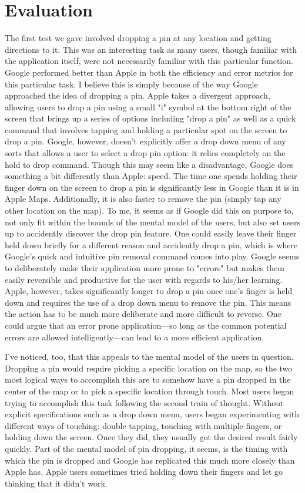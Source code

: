 \documentclass[12pt, oneside]{article}
\begin{document}
\section{Evaluation}
The first test we gave involved dropping a pin at any location and getting directions to it. This was an interesting task as many users, though familiar with the application itself, were not necessarily familiar with this particular function. Google performed better than Apple in both the efficiency and error metrics for this particular task. I believe this is simply because of the way Google approached the idea of dropping a pin. Apple takes a divergent approach, allowing users to drop a pin using a small "i" symbol at the bottom right of the screen that brings up a series of options including "drop a pin" as well as a quick command that involves tapping and holding a particular spot on the screen to drop a pin. Google, however, doesn’t explicitly offer a drop down menu of any sorts that allows a user to select a drop pin option: it relies completely on the hold to drop command. Though this may seem like a disadvantage, Google does something a bit differently than Apple: speed. The time one spends holding their finger down on the screen to drop a pin is significantly less in Google than it is in Apple Maps. Additionally, it is also faster to remove the pin (simply tap any other location on the map). To me, it seems as if Google did this on purpose to, not only fit within the bounds of the mental model of the users, but also set users up to accidently discover the drop pin feature. One could easily leave their finger held down briefly for a different reason and accidently drop a pin, which is where Google's quick and intuitive pin removal command comes into play. Google seems to deliberately make their application more prone to "errors" but makes them easily reversible and productive for the user with regards to his/her learning. Apple, however, takes significantly longer to drop a pin once one's finger is held down and requires the use of a drop down menu to remove the pin. This means the action has to be much more deliberate and more difficult to reverse. One could argue that an error prone application—so long as the common potential errors are allowed intelligently—can lead to a more efficient application.

I've noticed, too, that this appeals to the mental model of the users in question. Dropping a pin would require picking a specific location on the map, so the two most logical ways to accomplish this are to somehow have a pin dropped in the center of the map or to pick a specific location through touch. Most users began trying to accomplish this task following the second train of thought. Without explicit specifications such as a drop down menu, users began experimenting with different ways of touching: double tapping, touching with multiple fingers, or holding down the screen. Once they did, they usually got the desired result fairly quickly. Part of the mental model of pin dropping, it seems, is the timing with which the pin is dropped and Google has replicated this much more closely than Apple has. Apple users sometimes tried holding down their fingers and let go thinking that it didn't work.
\end{document}
